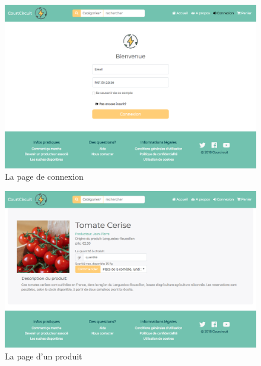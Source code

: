\documentclass[a4paper,12pt]{report}
\theoremstyle{break}
\theoremstyle{break}
\theoremstyle{break}
\theoremstyle{break}
\theoremstyle{definition}
\theoremstyle{remark}
\begin{document}
\begin{appendices}

\begin{figure}[!ht]
  \centering
  \includegraphics[scale=0.35]{images/signin.png}
  \caption{La page de connexion}
\end{figure}

\begin{figure}[!ht]
  \centering
  \includegraphics[scale=0.35]{images/produit.png}
  \caption{La page d'un produit}
\end{figure}


\end{appendices}
\end{document}
